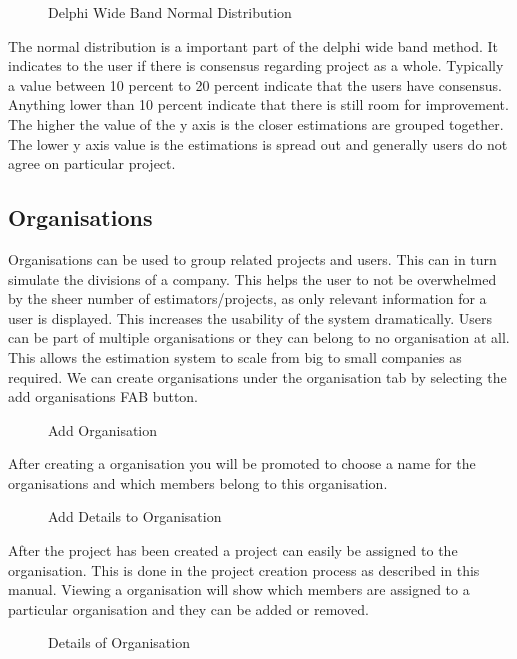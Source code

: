 \begin{itemize}
\begin{figure}[H]
	    	\caption{Delphi Wide Band Normal Distribution}
	    	\label{fig:Delphi Wide Band Normal Distribution}
   	\end{figure}
	The normal distribution is a important part of the delphi wide band method. It indicates to the user if there is consensus regarding project as a whole. Typically a value between 10 percent to 20 percent indicate that the users have consensus. Anything lower than 10 percent indicate that there is still room for improvement. The higher the value of the y axis is the closer estimations are grouped together. The lower y axis value is the estimations is spread out and generally users do not agree on particular project.
\end{itemize}
\subsection{Organisations}
Organisations can be used to group related projects and users. This can in turn simulate the divisions of a company. This helps the user to not  be overwhelmed by the sheer number of estimators/projects, as only relevant information for a user is displayed. This increases the usability of the system dramatically. Users can be part of multiple organisations or they can belong to no organisation at all. This allows the estimation system to scale from big to small companies as required. We can create organisations under the organisation tab by selecting the add organisations FAB button.
	\begin{figure}[H]
	    	\centering
	    	\caption{Add Organisation}
	    	\label{fig:Add Organisation}
   	\end{figure}
After creating a organisation you will be promoted to choose a name for the organisations and which members belong to this organisation.
	\begin{figure}[H]
	    	\centering
	    	\caption{Add Details to Organisation}
	    	\label{fig:Add Details to Organisation}
   	\end{figure}
After the project has been created a project can easily be assigned to the organisation. This is done in the project creation process as described in this manual.  Viewing a organisation will show which members are assigned to a particular organisation and they can be added or removed. 
	\begin{figure}[H]
	    	\centering
	    	\caption{Details of Organisation}
	    	\label{fig:Details of Organisation}
   	\end{figure}
	
	
	
	
	
	
	
	
	
	
	
	
	
	
	
	
	
	
	
	
	